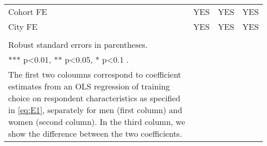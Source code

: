 \begin{longtable}{m{9cm}ccc}
Cohort FE&YES&YES&YES\\
City FE&YES&YES&YES\\
\midrule
\begin{minipage}{16cm}
\small{
{\textit Notes:} \\
Robust standard errors in parentheses. \\
*** p\textless{}0.01, ** p\textless{}0.05, * p\textless{}0.1 . \\
The first two coloumns correspond to coefficient estimates from an OLS regression of training choice on respondent characteristics as specified in  \ref{eq:E1}, separately for men (first column) and women (second column). In the third column, we show the difference between the two coefficients. 
}
\end{minipage} \\* \bottomrule
\end{longtable}
